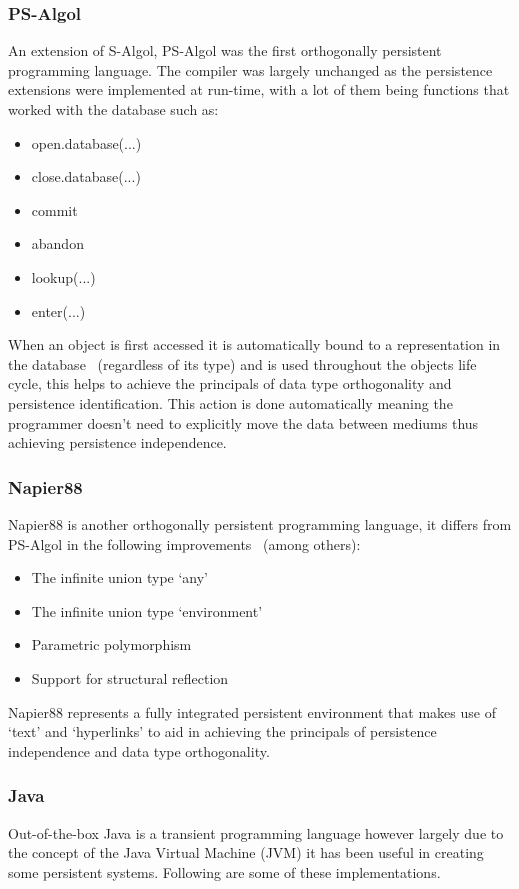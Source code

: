 \documentclass[a4,12pt]{article}
\begin{document}
\subsubsection{PS-Algol}
An extension of S-Algol, PS-Algol was the first orthogonally persistent programming language. The compiler was largely unchanged as the persistence extensions were implemented at run-time, with a lot of them being functions that worked with the database such as:
\begin{itemize}
    \item{open.database(...)}
    \item{close.database(...)}
    \item{commit}
    \item{abandon}
    \item{lookup(...)}
    \item{enter(...)}
\end{itemize}
When an object is first accessed it is automatically bound to a representation in the database~\citep{psalgol} (regardless of its type) and is used throughout the objects life cycle, this helps to achieve the principals of data type orthogonality and persistence identification. This action is done automatically meaning the programmer doesn't need to explicitly move the data between mediums thus achieving persistence independence.
\subsubsection{Napier88}
Napier88 is another orthogonally persistent programming language\citep{napier}, it differs from PS-Algol in the following improvements~\citep{ADearle} (among others):
\begin{itemize}
    \item{The infinite union type `any'}
    \item{The infinite union type `environment'} 
    \item{Parametric polymorphism}
    \item{Support for structural reflection}
\end{itemize}
Napier88 represents a fully integrated persistent environment that makes use of `text' and `hyperlinks' to aid in achieving the principals of persistence independence and data type orthogonality.
\subsubsection{Java}
Out-of-the-box Java is a transient programming language however largely due to the concept of the Java Virtual Machine (JVM) it has been useful in creating some persistent systems. Following are some of these implementations.
\end{document}
